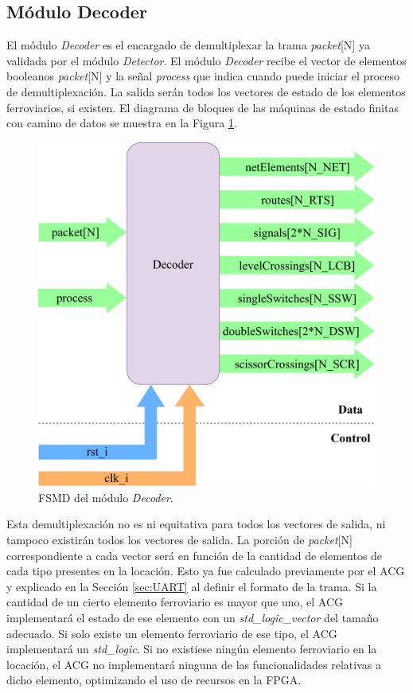 \subsection{Módulo Decoder}

El módulo \textit{Decoder} es el encargado de demultiplexar la trama \textit{packet}[N] ya validada por el módulo \textit{Detector}. El módulo \textit{Decoder} recibe el vector de elementos booleanos \textit{packet}[N] y la señal \textit{process} que indica cuando puede iniciar el proceso de demultiplexación. La salida serán todos los vectores de estado de los elementos ferroviarios, si existen. El diagrama de bloques de las máquinas de estado finitas con camino de datos se muestra en la Figura \ref{fig:Decoder_module}.

\begin{figure}[H]
	\centering
	\includegraphics[width=1\textwidth]{Figuras/Decoder_module.png}
	\centering\caption{FSMD del módulo \textit{Decoder}.}
	\label{fig:Decoder_module}
\end{figure}

Esta demultiplexación no es ni equitativa para todos los vectores de salida, ni tampoco existirán todos los vectores de salida. La porción de \textit{packet}[N] correspondiente a cada vector será en función de la cantidad de elementos de cada tipo presentes en la locación. Esto ya fue calculado previamente por el ACG y explicado en la Sección \ref{sec:UART} al definir el formato de la trama. Si la cantidad de un cierto elemento ferroviario es mayor que uno, el ACG implementará el estado de ese elemento con un \textit{std\_logic\_vector} del tamaño adecuado. Si solo existe un elemento ferroviario de ese tipo, el ACG implementará un \textit{std\_logic}. Si no existiese ningún elemento ferroviario en la locación, el ACG no implementará ninguna de las funcionalidades relativas a dicho elemento, optimizando el uso de recursos en la FPGA.
